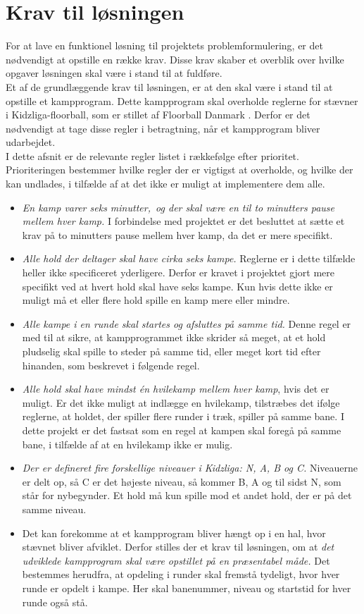 \section{Krav til løsningen}
For at lave en funktionel løsning til projektets problemformulering, er det nødvendigt at opstille en række krav. Disse krav skaber et overblik over hvilke opgaver løsningen skal være i stand til at fuldføre.
\\
Et af de grundlæggende krav til løsningen, er at den skal være i stand til at opstille et kampprogram. Dette kampprogram skal overholde reglerne for stævner i Kidzliga-floorball, som er stillet af Floorball Danmark \cite{kidzRegler}. Derfor er det nødvendigt at tage disse regler i betragtning, når et kampprogram bliver udarbejdet.\\
I dette afsnit er de relevante regler listet i rækkefølge efter prioritet. Prioriteringen bestemmer hvilke regler der er vigtigst at overholde, og hvilke der kan undlades, i tilfælde af at det ikke er muligt at implementere dem alle.
\begin{itemize}
    \item \textit{En kamp varer seks minutter,\ og der skal være en til to minutters pause mellem hver kamp.} I forbindelse med projektet er det besluttet at sætte et krav på to minutters pause mellem hver kamp, da det er mere specifikt.
    \item \textit{Alle hold der deltager skal have cirka seks kampe.} Reglerne er i dette tilfælde heller ikke specificeret yderligere. Derfor er kravet i projektet gjort mere specifikt ved at hvert hold skal have seks kampe. Kun hvis dette ikke er muligt må et eller flere hold spille en kamp mere eller mindre. 
    \item \textit{Alle kampe i en runde skal startes og afsluttes på samme tid.} Denne regel er med til at sikre, at kampprogrammet ikke skrider så meget, at et hold pludselig skal spille to steder på samme tid, eller meget kort tid efter hinanden, som beskrevet i følgende regel.
    \item \textit{Alle hold skal have mindst én hvilekamp mellem hver kamp}, hvis det er muligt. Er det ikke muligt at indlægge en hvilekamp, tilstræbes det ifølge reglerne, at holdet, der spiller flere runder i træk, spiller på samme bane. I dette projekt er det fastsat som en regel at kampen skal foregå på samme bane, i tilfælde af at en hvilekamp ikke er mulig. 
    \item \textit{Der er defineret fire forskellige niveauer i Kidzliga: N, A, B og C.} Niveauerne er delt op, så C er det højeste niveau, så kommer B, A og til sidst N, som står for nybegynder. Et hold må kun spille mod et andet hold, der er på det samme niveau.
    \item Det kan forekomme at et kampprogram bliver hængt op i en hal, hvor stævnet bliver afviklet. Derfor stilles der et krav til løsningen, om at \textit{det udviklede kampprogram skal være opstillet på en præsentabel måde.} Det bestemmes herudfra, at opdeling i runder skal fremstå tydeligt, hvor hver runde er opdelt i kampe. Her skal banenummer, niveau og startstid for hver runde også stå.
\end{itemize} 
